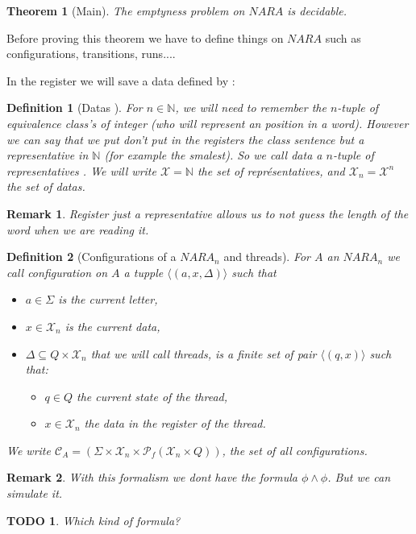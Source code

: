 \documentclass[a4paper,10pt]{report}
\newtheorem{thr}{Theorem} %
\newtheorem{df}{Definition}
\newtheorem{rk}{Remark}
\newtheorem{td}{TODO}
\newcommand{\C}{\mathcal{C}_{A}}
\newcommand{\Xa}{\mathcal{X}}
\newcommand{\X}{\mathcal{X}_{n}}
\begin{document}
\begin{thr}[Main]
  \label{main}
 The emptyness problem on $NARA$ is decidable.
\end{thr}


Before proving this theorem we have to define things on $NARA$ such as configurations, transitions, runs....


In the register we will save a data defined by :  
\begin{df}[Datas ]
  For $n\in \mathbb N$, we will need to remember the $n$-tuple of equivalence class's of integer (who will represent an position in a word).
  However we can say that we put don't put in the registers the class sentence but a representative in $\mathbb N$ (for example the smalest).
  So we call data a $n$-tuple of representatives .
  We will write $\Xa = \mathbb N$ the set of représentatives, and $\X = \Xa^n$ the set of datas.
\end{df}

\begin{rk}
 Register just a representative allows us to not guess the length of the word when we are reading it.
\end{rk}


\begin{df}[Configurations of a $NARA_n$ and threads]
For $A$ an $NARA_n$ we call configuration on $A$ a tupple  
 $\langle  (a ,x, \Delta  )  \rangle$
 such that 
  \begin{itemize}
    \item $a \in \Sigma$ is the current letter, 
    \item $x\in  \X$ is the current data, 
    \item $\Delta \subseteq Q \times \X$ that we will call threads, is a finite set of pair  
    $\langle (q,x)  \rangle$ such that:
      \begin{itemize}
	\item $q \in Q$ the current state of the thread,
	\item $x\in  \X $ the data in the register of the thread.
      \end{itemize}
   \end{itemize}
 We write $\C = ( \Sigma \times \X \times \mathcal{P}_f(\X \times Q))$, the set of all configurations.
\end{df}

\begin{rk}
  With this formalism we dont have the formula $ \phi \wedge \phi$. But we can simulate it.
\end{rk}
\begin{td}
  Which kind of formula?
\end{td}
\end{document}
